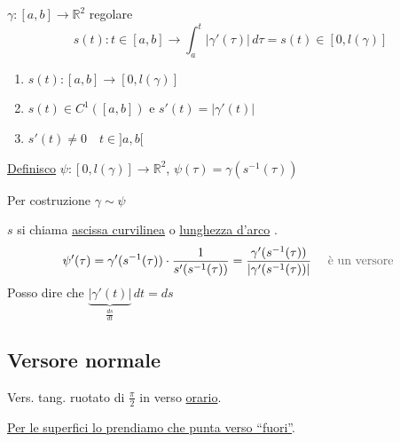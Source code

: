 $\gamma : [a, b] \to \mathbb{R}^2$ regolare
\[
s(t) : t \in [a, b] \to \int_a^t \vert \gamma'(\tau) \vert \, d\tau = s(t) \in [0, l(\gamma)]
\]

\begin{center}
\end{center}

\begin{enumerate}
    \item $s(t) : [a, b] \to [0, l(\gamma)]$ 
    \item $s(t) \in C^1([a, b])$ e $s'(t) = \vert \gamma'(t) \vert$ 
    \item $s'(t) \neq 0 \quad t \in ]a, b[$ 
\end{enumerate}

\underline{Definisco} $\psi : [0, l(\gamma)] \to \mathbb{R}^2$, $\psi(\tau) = \gamma(s^{-1}(\tau))$

Per costruzione $\gamma \sim \psi$

$s$ si chiama \underline{ascissa curvilinea} o \underline{lunghezza d'arco} .
\[
\psi'(\tau) = \gamma'(s^{-1}(\tau)) \cdot \frac{1}{s'(s^{-1}(\tau))} = \frac{\gamma'(s^{-1}(\tau))}{\vert \gamma'(s^{-1}(\tau)) \vert} \quad \text{\pencilnote{è un versore}}
\]
Posso dire che $\underbrace{\vert \gamma'(t) \vert}_{\frac{ds}{dt}} \, dt = ds$

\subsection{Versore normale}

Vers. tang. ruotato di $\frac{\pi}{2}$ in verso \underline{orario}.

\underline{Per le superfici lo prendiamo che punta verso ``fuori''}.

